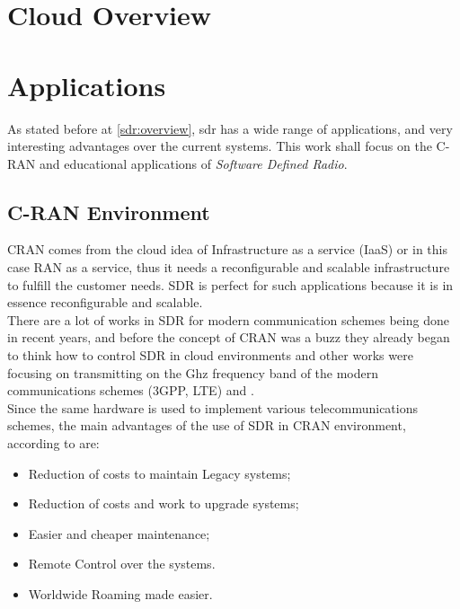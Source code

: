 \section{Cloud Overview}

\section{Applications}
\label{sec:sdr_app}

As stated before  at \ref{sdr:overview}, sdr has a wide range of applications,
and very interesting advantages over the current systems. This work shall focus
on the C-RAN and educational applications of \emph{Software Defined Radio}.

\subsection{C-RAN Environment}

CRAN comes from the cloud idea of Infrastructure as a service (IaaS) or in this
case RAN as a service, thus it needs a reconfigurable and scalable infrastructure
to fulfill the customer needs. SDR is perfect for such applications because  it
is in essence reconfigurable and scalable.\\

There are a lot of works in SDR for modern communication schemes being done in recent years,
and before the concept of CRAN was a buzz they already began to think how to control
SDR in cloud environments \cite{dayananda2012} and other works were focusing on transmitting on the
Ghz frequency band of the modern communications schemes (3GPP, LTE) \cite{kelley2009} and \cite{neenu2014}.\\

Since the same hardware is used to implement various telecommunications schemes,
the main advantages of the use of SDR in CRAN environment, according to \cite{dayananda2012} are:

\begin{itemize}
    \item Reduction of costs to maintain Legacy systems;
    \item Reduction of costs and work to upgrade systems;
    \item Easier and cheaper maintenance;
    \item Remote Control over the systems.
    \item Worldwide Roaming made easier.
\end{itemize}


